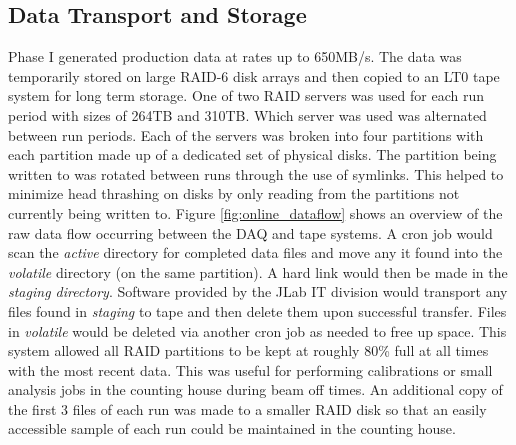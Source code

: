 


\subsection{Data Transport and Storage \label{sec:onlineprocessing}}

\GX Phase I generated production data at rates up to 650MB/s. The data was temporarily stored on large RAID-6 disk arrays and then copied to an LT0 tape system for long term storage. One of two RAID servers was used for each run period with sizes of 264TB and 310TB. Which server was used was alternated between run periods. Each of the servers was broken into four partitions with each partition made up of a dedicated set of physical disks. The partition being written to was rotated between runs through the use of symlinks. This helped to minimize head thrashing on disks by only reading from the partitions not currently being written to. Figure \ref{fig:online_dataflow} shows an overview of the raw data flow occurring between the DAQ and tape systems. A cron job would scan the \textit{active} directory for completed data files and move any it found into the \textit{volatile} directory (on the same partition). A hard link would then be made in the \textit{staging directory}. Software provided by the JLab IT division would transport any files found in \textit{staging} to tape and then delete them upon successful transfer. Files in \textit{volatile} would be deleted via another cron job as needed to free up space. This system allowed all RAID partitions to be kept at roughly 80\% full at all times with the most recent data. This was useful for performing calibrations or small analysis jobs in the counting house during beam off times. An additional copy of the first 3 files of each run was made to a smaller RAID disk so that an easily accessible sample of each run could be maintained in the counting house.

